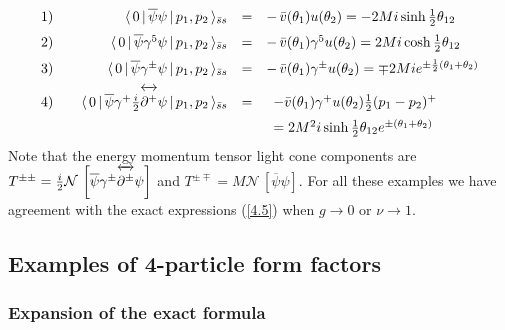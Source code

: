 \documentclass[a4paper,a4paper]{article}
\begin{document}
\[
\begin{array}{llrcl}
1) &  & \langle \,0\,|\,\overline{\psi }\psi \,|\,p_{1},p_{2}\,\rangle _{%
\bar{s}s} & = & -\,\bar{v}(\theta _{1})u(\theta _{2})=-2Mi\sinh \tfrac{1}{2}%
\theta _{12} \\[2mm] 
2) &  & \langle \,0\,|\,\overline{\psi }\gamma ^{5}\psi
\,|\,p_{1},p_{2}\,\rangle _{\bar{s}s} & = & -\,\bar{v}(\theta _{1})\gamma
^{5}u(\theta _{2})=2Mi\cosh \tfrac{1}{2}\theta _{12} \\[2mm] 
3) &  & \langle \,0\,|\,\overline{\psi }\gamma ^{\pm }\psi
\,|\,p_{1},p_{2}\,\rangle _{\bar{s}s} & = & -\,\bar{v}(\theta _{1})\gamma
^{\pm }u(\theta _{2})=\mp 2Mie^{\pm \frac{1}{2}(\theta _{1}+\theta _{2})} \\%
[2mm] 
4) &  & \langle \,0\,|\,\overline{\psi }\gamma ^{+}\tfrac{i}{2}%
\overleftrightarrow{\partial ^{+}\rule{0in}{0.15in}}\psi
\,|\,p_{1},p_{2}\,\rangle _{\bar{s}s} & = & 
\begin{array}[t]{l}
-\bar{v}(\theta _{1})\gamma ^{+}u(\theta _{2})\tfrac{1}{2}(p_{1}-p_{2})^{+}
\\[2mm] 
=2M^{2}i\sinh \tfrac{1}{2}\theta _{12}e^{\pm (\theta _{1}+\theta _{2})}
\end{array}
\end{array}
\]
Note that the energy momentum tensor light cone components are $T^{\pm \pm }=%
\tfrac{i}{2}\mathcal{N\,}\left[ \overline{\psi }\gamma ^{\pm }%
\overleftrightarrow{\partial ^{\pm }\rule{0in}{0.15in}}\psi \right] $ and $%
T^{\pm \mp }=M\mathcal{N\,}\left[ \overline{\psi }\psi \right] .$ For all
these examples we have agreement with the exact expressions (\ref{4.5}) when 
$g\rightarrow 0$ or $\nu \rightarrow 1$.

\subsection{Examples of 4-particle form factors}

\subsubsection{Expansion of the exact formula}
\end{document}
